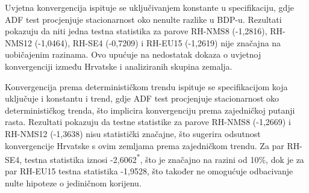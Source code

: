 \documentclass{crebsshr}
\begin{document}
Uvjetna konvergencija ispituje se uključivanjem konstante u specifikaciju, gdje ADF test procjenjuje stacionarnost oko nenulte razlike u BDP-u. Rezultati pokazuju da niti jedna testna statistika za parove RH-NMS8 (-1,2816), RH-NMS12 (-1,0464), RH-SE4 (-0,7209) i RH-EU15 (-1,2619) nije značajna na uobičajenim razinama. Ovo upućuje na nedostatak dokaza o uvjetnoj konvergenciji između Hrvatske i analiziranih skupina zemalja.

Konvergencija prema determinističkom trendu ispituje se specifikacijom koja uključuje i konstantu i trend, gdje ADF test procjenjuje stacionarnost oko determinističkog trenda, što implicira konvergenciju prema zajedničkoj putanji rasta. Rezultati pokazuju da testne statistike za parove RH-NMS8 (-1,2669) i RH-NMS12 (-1,3638) nisu statistički značajne, što sugerira odsutnost konvergencije Hrvatske s ovim zemljama prema zajedničkom trendu. Za par RH-SE4, testna statistika iznosi -2,6062\textsuperscript{*}, što je značajno na razini od 10\%, dok je za par RH-EU15 testna statistika -1,9528, što također ne omogućuje odbacivanje nulte hipoteze o jediničnom korijenu.
\end{document}
